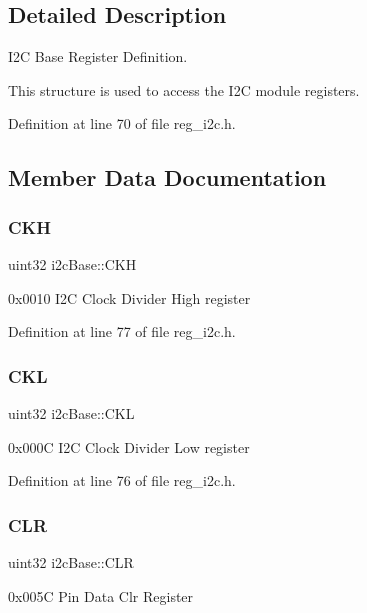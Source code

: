 \subsection{Detailed Description}
I2C Base Register Definition. 

This structure is used to access the I2C module registers. 

Definition at line 70 of file reg\+\_\+i2c.\+h.



\subsection{Member Data Documentation}
\mbox{\label{structi2cBase_a56bf7d44f7c3b0cd5c41056c8e4d6864}} 
\subsubsection{\texorpdfstring{C\+KH}{CKH}}
{\footnotesize\ttfamily uint32 i2c\+Base\+::\+C\+KH}

0x0010 I2C Clock Divider High register 

Definition at line 77 of file reg\+\_\+i2c.\+h.

\mbox{\label{structi2cBase_a7693e99a51d0a6b9b2154c0ac845bf7c}} 
\subsubsection{\texorpdfstring{C\+KL}{CKL}}
{\footnotesize\ttfamily uint32 i2c\+Base\+::\+C\+KL}

0x000C I2C Clock Divider Low register 

Definition at line 76 of file reg\+\_\+i2c.\+h.

\mbox{\label{structi2cBase_a784bac70d3f6dba62bf6d56e58b0214c}} 
\subsubsection{\texorpdfstring{C\+LR}{CLR}}
{\footnotesize\ttfamily uint32 i2c\+Base\+::\+C\+LR}

0x005C Pin Data Clr Register 

